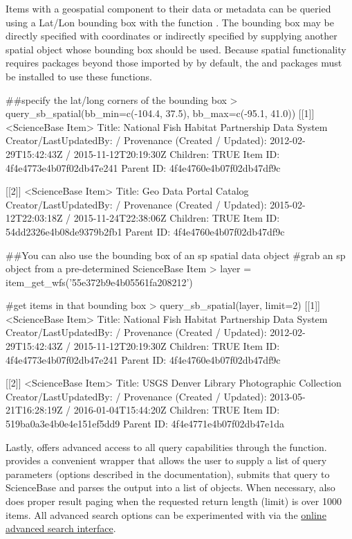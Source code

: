 Items with a geospatial component to their data or metadata can be queried using a
Lat/Lon bounding box with the function . The
bounding box may be directly specified with coordinates or indirectly specified
by supplying another spatial object whose bounding box should be used. Because
spatial functionality requires packages beyond those imported by  by default,
the  and  packages must be installed to use these functions.

\begin{example}
##specify the lat/long corners of the bounding box
> query_sb_spatial(bb_min=c(-104.4, 37.5), bb_max=c(-95.1, 41.0))
[[1]]
<ScienceBase Item>
  Title: National Fish Habitat Partnership Data System
  Creator/LastUpdatedBy:      /
  Provenance (Created / Updated):  2012-02-29T15:42:43Z / 2015-11-12T20:19:30Z
  Children: TRUE
  Item ID: 4f4e4773e4b07f02db47e241
  Parent ID: 4f4e4760e4b07f02db47df9c

[[2]]
<ScienceBase Item>
  Title: Geo Data Portal Catalog
  Creator/LastUpdatedBy:      /
  Provenance (Created / Updated):  2015-02-12T22:03:18Z / 2015-11-24T22:38:06Z
  Children: TRUE
  Item ID: 54dd2326e4b08de9379b2fb1
  Parent ID: 4f4e4760e4b07f02db47df9c

##You can also use the bounding box of an sp spatial data object
#grab an sp object from a pre-determined ScienceBase Item
> layer = item_get_wfs('55e372b9e4b05561fa208212')

#get items in that bounding box
> query_sb_spatial(layer, limit=2)
[[1]]
<ScienceBase Item>
  Title: National Fish Habitat Partnership Data System
  Creator/LastUpdatedBy:      /
  Provenance (Created / Updated):  2012-02-29T15:42:43Z / 2015-11-12T20:19:30Z
  Children: TRUE
  Item ID: 4f4e4773e4b07f02db47e241
  Parent ID: 4f4e4760e4b07f02db47df9c

[[2]]
<ScienceBase Item>
  Title: USGS Denver Library Photographic Collection
  Creator/LastUpdatedBy:      /
  Provenance (Created / Updated):  2013-05-21T16:28:19Z / 2016-01-04T15:44:20Z
  Children: TRUE
  Item ID: 519ba0a3e4b0e4e151ef5dd9
  Parent ID: 4f4e4771e4b07f02db47e1da

\end{example}

Lastly,  offers advanced access to all query capabilities through
the  function.  provides a convenient wrapper that 
allows the user to supply a list of query parameters (options described in the documentation),
submits that query to ScienceBase and parses the output
into a list of  objects. When necessary,  
also does proper result paging when the requested
return length (limit) is over 1000 items. All advanced search options can be experimented
with via the \href{https://www.sciencebase.gov/catalog/items/queryForm}
{online advanced search interface}.

